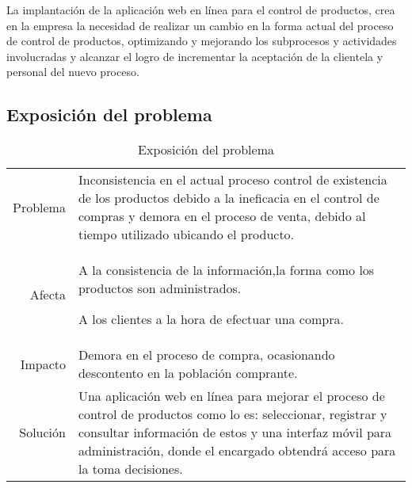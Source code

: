 \documentclass[a4paper,11pt, spanish]{report}
\begin{document}
La implantación de la aplicación web en línea para el control de productos, crea en la empresa la necesidad de realizar un cambio	en la forma   actual del proceso de control de productos, optimizando y mejorando los subprocesos y actividades involucradas y alcanzar el logro de incrementar la aceptación de la clientela y personal del nuevo proceso.
      
      \subsection{Exposición del problema}
      {\renewcommand{\arraystretch}{1.5}%
      \noindent\begin{table}[H]
      \noindent\begin{tabularx}{\textwidth}{r|X}
        Problema & Inconsistencia en el actual proceso control de existencia de los productos debido a la ineficacia en el control de compras y demora en el proceso de venta, debido al tiempo utilizado ubicando el producto.\\
        Afecta & A la consistencia de la información,la forma como los productos son
administrados.

A los clientes a la hora de efectuar una compra. \\
        Impacto & Demora en el proceso de compra, ocasionando descontento en la población
comprante. \\
        Solución & Una aplicación web en línea para mejorar el proceso de control de productos
como lo es: seleccionar, registrar y consultar información de estos y una interfaz móvil para administración, donde el encargado obtendrá acceso 
para la toma decisiones.\\
      \end{tabularx}
      \caption{Exposición del problema}
      \end{table}
      
}
\end{document}
